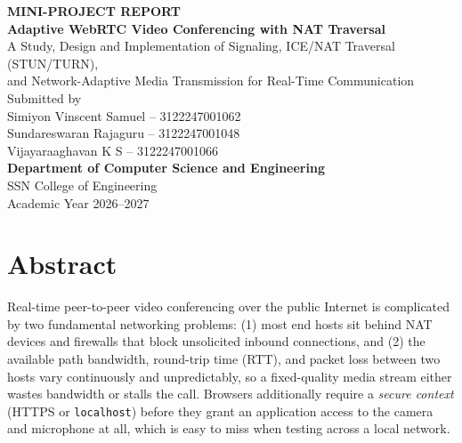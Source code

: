 \documentclass[12pt,a4paper]{report}
\begin{document}
\begin{titlepage}
  \centering
  \vspace*{1cm}
  {\Large \bfseries MINI-PROJECT REPORT}\\[1cm]

  {\LARGE \bfseries Adaptive WebRTC Video Conferencing with NAT Traversal}\\[0.5cm]
  {\large A Study, Design and Implementation of Signaling, ICE/NAT Traversal (STUN/TURN),\\
   and Network-Adaptive Media Transmission for Real-Time Communication}\\[2cm]

  {\large Submitted by}\\[0.7cm]
  {\large Simiyon Vinscent Samuel -- 3122247001062}\\[0.3cm]
  {\large Sundareswaran Rajaguru -- 3122247001048}\\[0.3cm]
  {\large Vijayaraaghavan K S -- 3122247001066}\\[2.5cm]

  {\large \bfseries Department of Computer Science and Engineering}\\[0.3cm]
  {\large SSN College of Engineering}\\[1.5cm]

  {\large Academic Year 2026--2027}
  \vfill
\end{titlepage}

\tableofcontents
\clearpage
{}

\chapter*{Abstract}

Real-time peer-to-peer video conferencing over the public Internet is complicated by two
fundamental networking problems: (1) most end hosts sit behind NAT devices and firewalls
that block unsolicited inbound connections, and (2) the available path bandwidth,
round-trip time (RTT), and packet loss between two hosts vary continuously and
unpredictably, so a fixed-quality media stream either wastes bandwidth or stalls the call.
Browsers additionally require a \emph{secure context} (HTTPS or \texttt{localhost}) before
they grant an application access to the camera and microphone at all, which is easy to miss
when testing across a local network.
\end{document}

